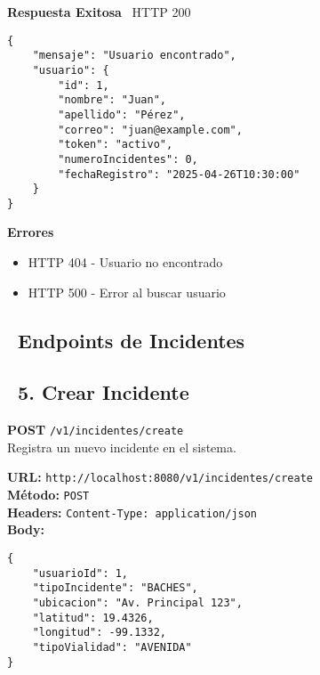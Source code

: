 \begin{tcolorbox}[response]
    \textbf{Respuesta Exitosa} \faCheckCircle\ \textcolor{successColor}{HTTP 200}
    \begin{verbatim}
{
    "mensaje": "Usuario encontrado",
    "usuario": {
        "id": 1,
        "nombre": "Juan",
        "apellido": "Pérez",
        "correo": "juan@example.com",
        "token": "activo",
        "numeroIncidentes": 0,
        "fechaRegistro": "2025-04-26T10:30:00"
    }
}
    \end{verbatim}
    \textbf{Errores}
    \begin{itemize}
        \item \textcolor{errorColor}{HTTP 404} - Usuario no encontrado
        \item \textcolor{errorColor}{HTTP 500} - Error al buscar usuario
    \end{itemize}
\end{tcolorbox}

\newpage


\subsection*{\faExclamationTriangle\ Endpoints de Incidentes}

\subsection*{\faServer\ 5. Crear Incidente}
\begin{tcolorbox}[endpoint]
    \textbf{POST} \texttt{/v1/incidentes/create}\\
    Registra un nuevo incidente en el sistema.
\end{tcolorbox}

\begin{tcolorbox}[request]
    \textbf{URL:} \textcolor{urlColor}{\texttt{http://localhost:8080/v1/incidentes/create}}\\
    \textbf{Método:} \textcolor{methodColor}{\texttt{POST}}\\
    \textbf{Headers:} \textcolor{headerColor}{\texttt{Content-Type: application/json}}\\
    \textbf{Body:}
    \begin{verbatim}
{
    "usuarioId": 1,
    "tipoIncidente": "BACHES",
    "ubicacion": "Av. Principal 123",
    "latitud": 19.4326,
    "longitud": -99.1332,
    "tipoVialidad": "AVENIDA"
}
    \end{verbatim}
\end{tcolorbox}

